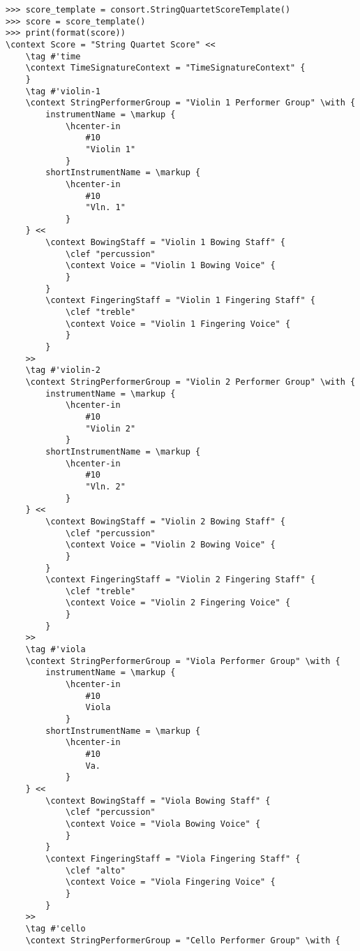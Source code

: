 \begin{abjadbookoutput}
\begin{singlespacing}
\vspace{-0.5\baselineskip}
\begin{lstlisting}
>>> score_template = consort.StringQuartetScoreTemplate()
>>> score = score_template()
>>> print(format(score))
\context Score = "String Quartet Score" <<
    \tag #'time
    \context TimeSignatureContext = "TimeSignatureContext" {
    }
    \tag #'violin-1
    \context StringPerformerGroup = "Violin 1 Performer Group" \with {
        instrumentName = \markup {
            \hcenter-in
                #10
                "Violin 1"
            }
        shortInstrumentName = \markup {
            \hcenter-in
                #10
                "Vln. 1"
            }
    } <<
        \context BowingStaff = "Violin 1 Bowing Staff" {
            \clef "percussion"
            \context Voice = "Violin 1 Bowing Voice" {
            }
        }
        \context FingeringStaff = "Violin 1 Fingering Staff" {
            \clef "treble"
            \context Voice = "Violin 1 Fingering Voice" {
            }
        }
    >>
    \tag #'violin-2
    \context StringPerformerGroup = "Violin 2 Performer Group" \with {
        instrumentName = \markup {
            \hcenter-in
                #10
                "Violin 2"
            }
        shortInstrumentName = \markup {
            \hcenter-in
                #10
                "Vln. 2"
            }
    } <<
        \context BowingStaff = "Violin 2 Bowing Staff" {
            \clef "percussion"
            \context Voice = "Violin 2 Bowing Voice" {
            }
        }
        \context FingeringStaff = "Violin 2 Fingering Staff" {
            \clef "treble"
            \context Voice = "Violin 2 Fingering Voice" {
            }
        }
    >>
    \tag #'viola
    \context StringPerformerGroup = "Viola Performer Group" \with {
        instrumentName = \markup {
            \hcenter-in
                #10
                Viola
            }
        shortInstrumentName = \markup {
            \hcenter-in
                #10
                Va.
            }
    } <<
        \context BowingStaff = "Viola Bowing Staff" {
            \clef "percussion"
            \context Voice = "Viola Bowing Voice" {
            }
        }
        \context FingeringStaff = "Viola Fingering Staff" {
            \clef "alto"
            \context Voice = "Viola Fingering Voice" {
            }
        }
    >>
    \tag #'cello
    \context StringPerformerGroup = "Cello Performer Group" \with {

\end{lstlisting}
\end{singlespacing}
\end{abjadbookoutput}
